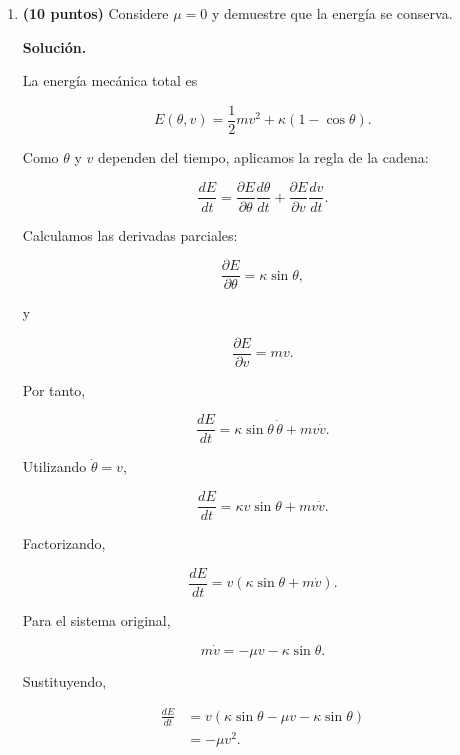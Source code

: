 \documentclass[a4paper,12pt]{article}
\newcommand{\solucion}{
\par\medskip
{\color{solutioncolor}\textbf{Solución.}}
\par
}
\begin{document}
\begin{enumerate}[leftmargin=*,
itemsep=0.8cm]
\begin{enumerate}[label=\alph*),
leftmargin=*,itemsep=0.5cm]
Existen dos tipos de posiciones
de equilibrio:

\begin{itemize}

\item Cuando $\theta=2k\pi$,
el péndulo se encuentra en
la posición vertical inferior.

\item Cuando
$\theta=(2k+1)\pi$,
el péndulo se encuentra en
la posición vertical superior.

\end{itemize}

En ambos casos, la velocidad
angular es nula. La existencia de un equilibrio
no implica necesariamente que
este sea estable.

\item \textbf{(10 puntos)}
Considere $\mu=0$ y demuestre
que la energía se conserva.

\solucion

La energía mecánica total es

\[
E(\theta,v)
=
\frac12 mv^2+
\kappa(1-\cos\theta).
\]

Como $\theta$ y $v$ dependen
del tiempo, aplicamos la
regla de la cadena:

\[
\frac{dE}{dt}
=
\frac{\partial E}
{\partial\theta}
\frac{d\theta}{dt}
+
\frac{\partial E}
{\partial v}
\frac{dv}{dt}.
\]

Calculamos las derivadas
parciales:

\[
\frac{\partial E}
{\partial\theta}
=
\kappa\sin\theta,
\]

y

\[
\frac{\partial E}
{\partial v}=mv.
\]

Por tanto,

\[
\frac{dE}{dt}
=
\kappa\sin\theta\,\dot\theta
+mv\dot v.
\]

Utilizando $\dot\theta=v$,

\[
\frac{dE}{dt}
=
\kappa v\sin\theta
+mv\dot v.
\]

Factorizando,

\[
\frac{dE}{dt}
=
v(\kappa\sin\theta+m\dot v).
\]

Para el sistema original,

\[
m\dot v=-\mu v-\kappa\sin\theta.
\]

Sustituyendo,

\begin{align*}
\frac{dE}{dt}
&=
v(\kappa\sin\theta
-\mu v-\kappa\sin\theta)\\
&=-\mu v^2.
\end{align*}


\end{enumerate}
\end{enumerate}
\end{document}
